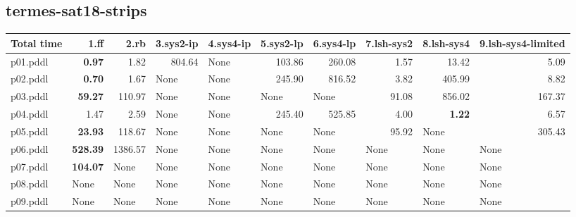 \documentclass{article}
\begin{document}
\hypertarget{total_time-termes-sat18-strips}{}
\subsection*{termes-sat18-strips}

\begin{tabular}{@{}lrrrrrrrrr@{}}
Total time & 1.ff & 2.rb & 3.sys2-ip & 4.sys4-ip & 5.sys2-lp & 6.sys4-lp & 7.lsh-sys2 & 8.lsh-sys4 & 9.lsh-sys4-limited \\
\midrule
p01.pddl & \textbf{0.97} & 1.82 & 804.64 & \multicolumn{1}{|l|}{None} & 103.86 & 260.08 & 1.57 & 13.42 & 5.09 \\
p02.pddl & \textbf{0.70} & 1.67 & \multicolumn{1}{|l|}{None} & \multicolumn{1}{|l|}{None} & 245.90 & 816.52 & 3.82 & 405.99 & 8.82 \\
p03.pddl & \textbf{59.27} & 110.97 & \multicolumn{1}{|l|}{None} & \multicolumn{1}{|l|}{None} & \multicolumn{1}{|l|}{None} & \multicolumn{1}{|l|}{None} & 91.08 & 856.02 & 167.37 \\
p04.pddl & 1.47 & 2.59 & \multicolumn{1}{|l|}{None} & \multicolumn{1}{|l|}{None} & 245.40 & 525.85 & 4.00 & \textbf{1.22} & 6.57 \\
p05.pddl & \textbf{23.93} & 118.67 & \multicolumn{1}{|l|}{None} & \multicolumn{1}{|l|}{None} & \multicolumn{1}{|l|}{None} & \multicolumn{1}{|l|}{None} & 95.92 & \multicolumn{1}{|l|}{None} & 305.43 \\
p06.pddl & \textbf{528.39} & 1386.57 & \multicolumn{1}{|l|}{None} & \multicolumn{1}{|l|}{None} & \multicolumn{1}{|l|}{None} & \multicolumn{1}{|l|}{None} & \multicolumn{1}{|l|}{None} & \multicolumn{1}{|l|}{None} & \multicolumn{1}{|l|}{None} \\
p07.pddl & \textbf{104.07} & \multicolumn{1}{|l|}{None} & \multicolumn{1}{|l|}{None} & \multicolumn{1}{|l|}{None} & \multicolumn{1}{|l|}{None} & \multicolumn{1}{|l|}{None} & \multicolumn{1}{|l|}{None} & \multicolumn{1}{|l|}{None} & \multicolumn{1}{|l|}{None} \\
p08.pddl & \multicolumn{1}{|l|}{None} & \multicolumn{1}{|l|}{None} & \multicolumn{1}{|l|}{None} & \multicolumn{1}{|l|}{None} & \multicolumn{1}{|l|}{None} & \multicolumn{1}{|l|}{None} & \multicolumn{1}{|l|}{None} & \multicolumn{1}{|l|}{None} & \multicolumn{1}{|l|}{None} \\
p09.pddl & \multicolumn{1}{|l|}{None} & \multicolumn{1}{|l|}{None} & \multicolumn{1}{|l|}{None} & \multicolumn{1}{|l|}{None} & \multicolumn{1}{|l|}{None} & \multicolumn{1}{|l|}{None} & \multicolumn{1}{|l|}{None} & \multicolumn{1}{|l|}{None} & \multicolumn{1}{|l|}{None} \\

\end{tabular}
\end{document}
